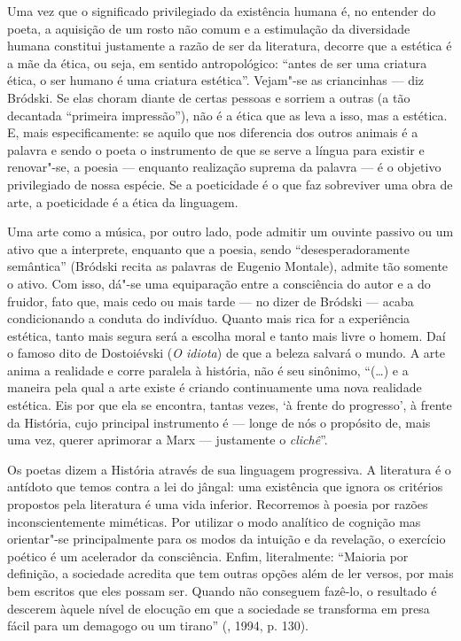 Uma vez que o significado privilegiado da existência humana é, no
entender do poeta, a aquisição de um rosto não comum e a
estimulação da diversidade humana constitui justamente a razão de ser da
literatura, decorre que a estética é a mãe da ética, ou seja, em sentido
antropológico: ``antes de ser uma criatura ética, o ser humano é uma
criatura estética''. Vejam"-se as criancinhas --- diz Bródski. Se elas
choram diante de certas pessoas e sorriem a outras (a tão decantada
``primeira impressão''), não é a ética que as leva a isso, mas a
estética. E, mais especificamente: se aquilo que nos diferencia
dos outros animais é a palavra e sendo o poeta o instrumento de que se
serve a língua para existir e renovar"-se, a poesia --- enquanto
realização suprema da palavra --- é o objetivo privilegiado de nossa
espécie. Se a poeticidade é o que faz sobreviver uma obra de arte, a
poeticidade é a ética da linguagem.

Uma arte como a música, por outro lado, pode admitir um ouvinte passivo
ou um ativo que a interprete, enquanto que a poesia, sendo
``desesperadoramente semântica'' (Bródski recita as palavras de Eugenio Montale),
 admite tão somente o ativo. Com isso, dá"-se uma
equiparação entre a consciência do autor e a do fruidor, fato que, mais
cedo ou mais tarde --- no dizer de Bródski --- acaba condicionando a
conduta do indivíduo. Quanto mais rica for a experiência estética, tanto
mais segura será a escolha moral e tanto mais livre o homem. Daí o
famoso dito de Dostoiévski (\emph{O idiota}) de que a beleza salvará o mundo. A arte anima
a realidade e corre paralela à história, não é seu sinônimo, ``(\ldots{}) e a
maneira pela qual a arte existe é criando continuamente uma nova
realidade estética. Eis por que ela se encontra, tantas vezes, `à frente
do progresso', à frente da História, cujo principal instrumento é ---
longe de nós o propósito de, mais uma vez, querer aprimorar a Marx ---
justamente o \emph{clichê}''.

Os poetas dizem a História através de sua linguagem progressiva. A
literatura é o antídoto que temos contra a lei do jângal: uma existência
que ignora os critérios propostos pela literatura é uma vida inferior.
Recorremos à poesia por razões inconscientemente miméticas. Por utilizar
o modo analítico de cognição mas orientar"-se principalmente para os
modos da intuição e da revelação, o exercício poético é um acelerador da
consciência. Enfim, literalmente: ``Maioria por definição, a sociedade acredita que tem
outras opções além de ler versos, por mais bem
escritos que eles possam ser. Quando não conseguem fazê-lo, o resultado é descerem àquele nível de
 elocução em que a sociedade se transforma em presa fácil para um 
demagogo ou um tirano'' (, 1994, p. 130).

